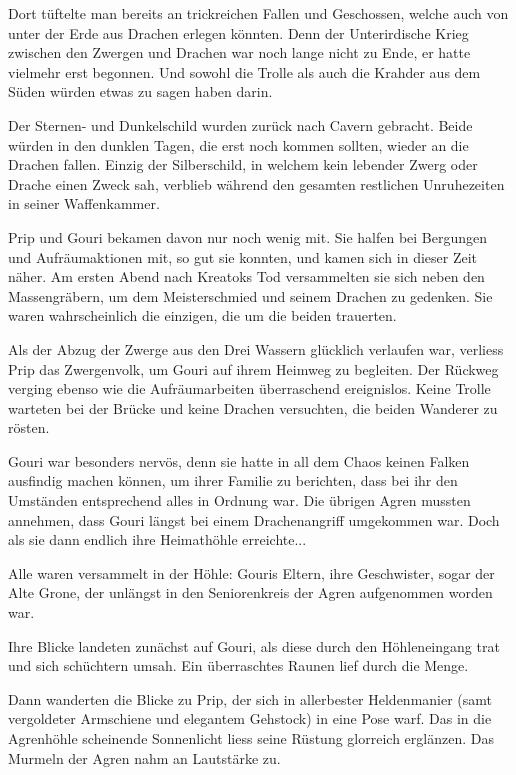 Dort tüftelte man bereits an trickreichen Fallen und Geschossen, welche auch von unter der Erde aus Drachen erlegen könnten. Denn der Unterirdische Krieg zwischen den Zwergen und Drachen war noch lange nicht zu Ende, er hatte vielmehr erst begonnen. Und sowohl die Trolle als auch die Krahder aus dem Süden würden etwas zu sagen haben darin.

Der Sternen- und Dunkelschild wurden zurück nach Cavern gebracht. Beide würden in den dunklen Tagen, die erst noch kommen sollten, wieder an die Drachen fallen. Einzig der Silberschild, in welchem kein lebender Zwerg oder Drache einen Zweck sah, verblieb während den gesamten restlichen Unruhezeiten in seiner Waffenkammer.

Prip und Gouri bekamen davon nur noch wenig mit. Sie halfen bei Bergungen und Aufräumaktionen mit, so gut sie konnten, und kamen sich in dieser Zeit näher. Am ersten Abend nach Kreatoks Tod versammelten sie sich neben den Massengräbern, um dem Meisterschmied und seinem Drachen zu gedenken. Sie waren wahrscheinlich die einzigen, die um die beiden trauerten.

Als der Abzug der Zwerge aus den Drei Wassern glücklich verlaufen war, verliess Prip das Zwergenvolk, um Gouri auf ihrem Heimweg zu begleiten. Der Rückweg verging ebenso wie die Aufräumarbeiten überraschend ereignislos. Keine Trolle warteten bei der Brücke und keine Drachen versuchten, die beiden Wanderer zu rösten.

Gouri war besonders nervös, denn sie hatte in all dem Chaos keinen Falken ausfindig machen können, um ihrer Familie zu berichten, dass bei ihr den Umständen entsprechend alles in Ordnung war. Die übrigen Agren mussten annehmen, dass Gouri längst bei einem Drachenangriff umgekommen war. Doch als sie dann endlich ihre Heimathöhle erreichte...



\trennzeichen



Alle waren versammelt in der Höhle: Gouris Eltern, ihre Geschwister, sogar der Alte Grone, der unlängst in den Seniorenkreis der Agren aufgenommen worden war.

Ihre Blicke landeten zunächst auf Gouri, als diese durch den Höhleneingang trat und sich schüchtern umsah. Ein überraschtes Raunen lief durch die Menge.

Dann wanderten die Blicke zu Prip, der sich in allerbester Heldenmanier (samt vergoldeter Armschiene und elegantem Gehstock) in eine Pose warf. Das in die Agrenhöhle scheinende Sonnenlicht liess seine Rüstung glorreich erglänzen. Das Murmeln der Agren nahm an Lautstärke zu.

